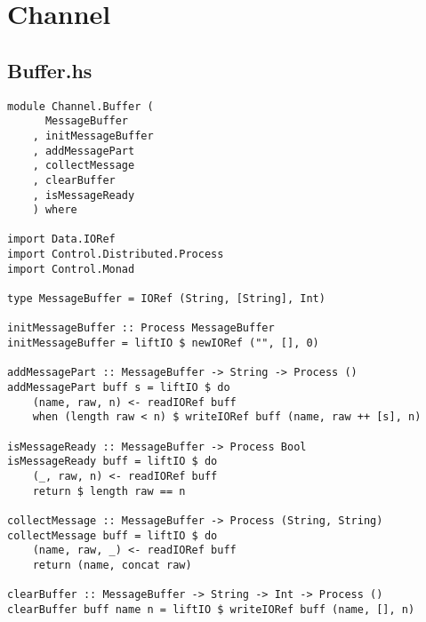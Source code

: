 \documentclass[russian,utf8,simple,emptystyle]{eskdtext}
\begin{document}
\section{Channel}
\subsection{Buffer.hs}
\begin{lstlisting}
module Channel.Buffer (
      MessageBuffer
    , initMessageBuffer
    , addMessagePart
    , collectMessage
    , clearBuffer
    , isMessageReady
    ) where

import Data.IORef 
import Control.Distributed.Process
import Control.Monad 

type MessageBuffer = IORef (String, [String], Int)

initMessageBuffer :: Process MessageBuffer
initMessageBuffer = liftIO $ newIORef ("", [], 0)

addMessagePart :: MessageBuffer -> String -> Process ()
addMessagePart buff s = liftIO $ do
    (name, raw, n) <- readIORef buff 
    when (length raw < n) $ writeIORef buff (name, raw ++ [s], n)

isMessageReady :: MessageBuffer -> Process Bool
isMessageReady buff = liftIO $ do
    (_, raw, n) <- readIORef buff 
    return $ length raw == n

collectMessage :: MessageBuffer -> Process (String, String)
collectMessage buff = liftIO $ do
    (name, raw, _) <- readIORef buff 
    return (name, concat raw)

clearBuffer :: MessageBuffer -> String -> Int -> Process ()
clearBuffer buff name n = liftIO $ writeIORef buff (name, [], n)
\end{lstlisting}
\end{document}
